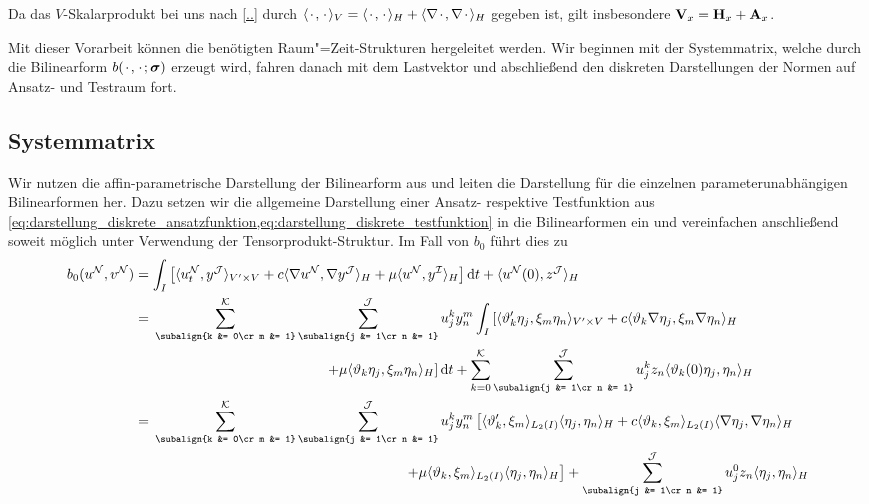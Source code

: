 \documentclass[../main.tex]{subfiles}
\begin{document}
Da das $V$-Skalarprodukt bei uns nach \cref{..} durch $\langle{\mkern2mu\cdot\mkern2mu},{\mkern2mu\cdot\mkern2mu}\rangle_{V} = \langle{\mkern2mu\cdot\mkern2mu},{\mkern2mu\cdot\mkern2mu}\rangle_{H} + \langle\nabla{\mkern2mu\cdot\mkern2mu},\nabla{\mkern2mu\cdot\mkern2mu}\rangle_{H}$ gegeben ist, gilt insbesondere $\mathbf{V}_{x} = \mathbf{H}_{x} + \mathbf{A}_{x}$.

Mit dieser Vorarbeit können die benötigten Raum"=Zeit-Strukturen hergeleitet werden.
Wir beginnen mit der Systemmatrix, welche durch die Bilinearform $b({\mkern2mu\cdot\mkern2mu}, {\mkern2mu\cdot\mkern2mu}; \bm \sigma)$ erzeugt wird, fahren danach mit dem Lastvektor und abschließend den diskreten Darstellungen der Normen auf Ansatz- und Testraum fort.

\subsection*{Systemmatrix}

Wir nutzen die affin-parametrische Darstellung der Bilinearform aus und leiten die Darstellung für die einzelnen parameterunabhängigen Bilinearformen her.
Dazu setzen wir die allgemeine Darstellung einer Ansatz- respektive Testfunktion aus \cref{eq:darstellung_diskrete_ansatzfunktion,eq:darstellung_diskrete_testfunktion} in die Bilinearformen ein und vereinfachen anschließend soweit möglich unter Verwendung der Tensorprodukt-Struktur.
Im Fall von $b_{0}$ führt dies zu
\begin{align}
    b_{0}(u^{\mathcal N}, v^{\mathcal N})
    &=
    \int_{I} \left[ \skp{u^{\mathcal N}_{t}}{y^{\mathcal J}}{V' \times V} + c \skp{\grad u^{\mathcal N}}{\grad y^{\mathcal J}}{H} + \mu \skp{u^{\mathcal N}}{y^{\mathcal I}}{H} \right] \diff t + \skp{u^{\mathcal N}(0)}{z^{\mathcal J}}{H}
    \\&= \begin{multlined}[t][.8\displaywidth]
    \sum_{\subalign{k &= 0\cr m &= 1}}^{\mathcal K} \sum_{\subalign{j &= 1\cr n &= 1}}^{\mathcal J} u^{k}_{j} y^{m}_{n}
    \int_{I} \left[ \skp{\theta_{k}' \eta_{j}}{\xi_{m} \eta_{n}}{V' \times V} + c \skp{\theta_{k} \grad \eta_{j}}{\xi_{m} \grad \eta_{n}}{H} \right.
    \\ \left.+ \mu \skp{\theta_{k} \eta_{j}}{\xi_{m} \eta_{n}}{H} \right] \diff t
    + \sum_{k = 0}^{\mathcal K} \sum_{\subalign{j &= 1\cr n &= 1}}^{\mathcal J} u^{k}_{j} z_{n} \skp{\theta_{k}(0) \eta_{j}}{\eta_{n}}{H}
    \end{multlined}
    \\&=\begin{multlined}[t][.8\displaywidth]
    \sum_{\subalign{k &= 0\cr m &= 1}}^{\mathcal K} \sum_{\subalign{j &= 1\cr n &= 1}}^{\mathcal J} u^{k}_{j} y^{m}_{n} \left[ \skp{\theta_{k}'}{\xi_{m}}{L_{2}(I)} \skp{\eta_{j}}{\eta_{n}}{H} + c \skp{\theta_{k}}{\xi_{m}}{L_{2}(I)}\skp{\grad \eta_{j}}{\grad \eta_{n}}{H} \right.
    \\\left. + \mu \skp{\theta_{k}}{\xi_{m}}{L_{2}(I)} \skp{\eta_{j}}{\eta_{n}}{H} \right] + \sum_{\subalign{j &= 1\cr n &= 1}}^{\mathcal J} u^{0}_{j}  z_{n} \skp{\eta_{j}}{\eta_{n}}{H}
    \end{multlined}
\end{align}
\end{document}

